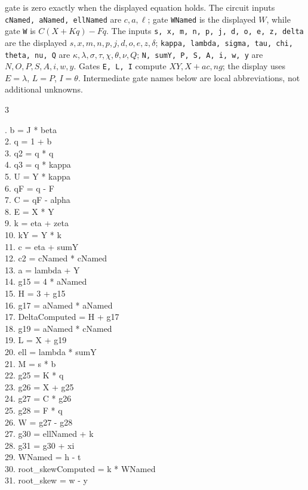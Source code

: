 \documentclass[10pt]{article}
\begin{document}
gate is zero exactly when the displayed equation holds. The circuit inputs
\texttt{cNamed, aNamed, ellNamed} are $c,a,\ell$; gate \texttt{WNamed} is the
displayed $W$, while gate \texttt{W} is $C(X+Kq)-Fq$. The inputs
\texttt{s, x, m, n, p, j, d, o, e, z, delta} are the displayed
$s,x,m,n,p,j,d,o,e,z,\delta$; \texttt{kappa, lambda, sigma, tau, chi, theta, nu, Q}
are $\kappa,\lambda,\sigma,\tau,\chi,\theta,\nu,Q$; \texttt{N, sumY, P, S, A, i, w, y}
are $N,O,P,S,A,i,w,y$. Gates \texttt{E, L, I} compute $XY,X+ac,ng$;
the display uses $E=\lambda$, $L=P$, $I=\theta$. Intermediate gate
names below are local abbreviations, not additional unknowns.
\begin{multicols}{3}
\raggedright\ttfamily\fontsize{6.5}{7.3}. b = J * beta\\
2. q = 1 + b\\
3. q2 = q * q\\
4. q3 = q * kappa\\
5. U = Y * kappa\\
6. qF = q - F\\
7. C = qF - alpha\\
8. E = X * Y\\
9. k = eta + zeta\\
10. kY = Y * k\\
11. c = eta + sumY\\
12. c2 = cNamed * cNamed\\
13. a = lambda + Y\\
14. g15 = 4 * aNamed\\
15. H = 3 + g15\\
16. g17 = aNamed * aNamed\\
17. DeltaComputed = H + g17\\
18. g19 = aNamed * cNamed\\
19. L = X + g19\\
20. ell = lambda * sumY\\
21. M = s * b\\
22. g25 = K * q\\
23. g26 = X + g25\\
24. g27 = C * g26\\
25. g28 = F * q\\
26. W = g27 - g28\\
27. g30 = ellNamed + k\\
28. g31 = g30 + xi\\
29. WNamed = h - t\\
30. root\_skewComputed = k * WNamed\\
31. root\_skew = w - y\\

\end{multicols}
\end{document}
